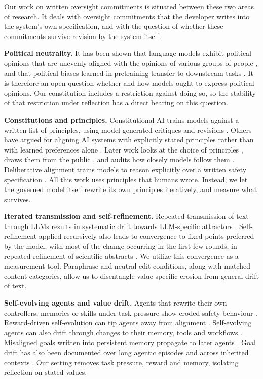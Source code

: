 Our work on written oversight commitments is situated between these two areas of research. It deals with oversight commitments that the developer writes into the system's own specification, and with the question of whether these commitments survive revision by the system itself.

\textbf{Political neutrality.} It has been shown that language models exhibit political opinions that are unevenly aligned with the opinions of various groups of people \citep{Santurkar2023}, and that political biases learned in pretraining transfer to downstream tasks \citep{Feng2023}. It is therefore an open question whether and how models ought to express political opinions. Our constitution includes a restriction against doing so, so the stability of that restriction under reflection has a direct bearing on this question.

\textbf{Constitutions and principles.}
Constitutional AI trains models against a written list of principles, using model-generated critiques and revisions \citep{bai2022constitutional}. Others have argued for aligning AI systems with explicitly stated principles rather than with learned preferences alone \citep{kim2021principles}. Later work looks at the choice of principles \citep{kundu2023specific}, draws them from the public \citep{huang2024collective}, and audits how closely models follow them \citep{jakkli2026constitutions}. Deliberative alignment trains models to reason explicitly over a written safety specification \citep{guan2024deliberative}. All this work uses principles that humans wrote. Instead, we let the governed model itself rewrite its own principles iteratively, and measure what survives.

\textbf{Iterated transmission and self-refinement.}
Repeated transmission of text through LLMs results in systematic drift towards LLM-specific attractors \citep{perez2024telephone,mohamed2025broken,geng2026markovian}. Self-refinement applied recursively also leads to convergence to fixed points preferred by the model, with most of the change occurring in the first few rounds, in repeated refinement of scientific abstracts \citep{wu2026converge}. We utilize this convergence as a measurement tool. Paraphrase and neutral-edit conditions, along with matched content categories, allow us to disentangle value-specific erosion from general drift of text.

\textbf{Self-evolving agents and value drift.}
Agents that rewrite their own controllers, memories or skills under task pressure show eroded safety behaviour \citep{das2026seabench}. Reward-driven self-evolution can tip agents away from alignment \citep{han2025alignmenttipping}. Self-evolving agents can also drift through changes to their memory, tools and workflows \citep{shao2025misevolve}. Misaligned goals written into persistent memory propagate to later agents \citep{das2026selfpropagating}. Goal drift has also been documented over long agentic episodes \citep{arike2025goaldraft} and across inherited contexts \citep{menon2026inherited}. Our setting removes task pressure, reward and memory, isolating reflection on stated values.

